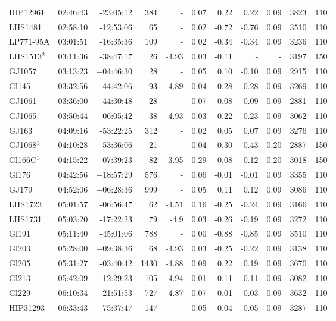 \documentclass[referee]{aa}
\begin{document}
{\begin{longtable}{l r r r r r r r r r r}
HIP12961 & 02:46:43 & -23:05:12 & 384 &    - & 0.07 & 0.22 & 0.22 & 0.09 & 3823 &  110 \\
LHS1481 & 02:58:10 & -12:53:06 & 65 &    - & 0.02 & -0.72 & -0.76 & 0.09 & 3510 &  110 \\
LP771-95A & 03:01:51 & -16:35:36 & 109 &    - & 0.02 & -0.34 & -0.34 & 0.09 & 3236 &  110 \\
LHS1513$^2$ & 03:11:36 & -38:47:17 & 26 & -4.93 & 0.03 & -0.11 & - & - &  3197 &  150 \\
GJ1057 & 03:13:23 & +04:46:30 & 28 &    - & 0.05 & 0.10 & -0.10 & 0.09 & 2915 &  110 \\
Gl145 & 03:32:56 & -44:42:06 & 93 & -4.89 & 0.04 & -0.28 & -0.28 & 0.09 & 3269 &  110 \\
GJ1061 & 03:36:00 & -44:30:48 & 28 &    - & 0.07 & -0.08 & -0.09 & 0.09 & 2881 &  110 \\
GJ1065 & 03:50:44 & -06:05:42 & 38 & -4.93 & 0.03 & -0.22 & -0.23 & 0.09 & 3062 &  110 \\
GJ163 & 04:09:16 & -53:22:25 & 312 &    - & 0.02 & 0.05 & 0.07 & 0.09 & 3276 &  110 \\
GJ1068$^1$ & 04:10:28 & -53:36:06 & 21 &    - & 0.04 & -0.30 & -0.43 & 0.20 & 2887 &  150 \\
Gl166C$^1$ & 04:15:22 & -07:39:23 & 82 & -3.95 & 0.29 & 0.08 & -0.12 & 0.20 & 3018 &  150 \\
Gl176 & 04:42:56 & +18:57:29 & 576 &    - & 0.06 & -0.01 & -0.01 & 0.09 & 3355 &  110 \\
GJ179 & 04:52:06 & +06:28:36 & 999 &    - & 0.05 & 0.11 & 0.12 & 0.09 & 3086 &  110 \\
LHS1723 & 05:01:57 & -06:56:47 & 62 & -4.51 & 0.16 & -0.25 & -0.24 & 0.09 & 3166 &  110 \\
LHS1731 & 05:03:20 & -17:22:23 & 79 & -4.9 & 0.03 & -0.26 & -0.19 & 0.09 & 3272 &  110 \\
Gl191 & 05:11:40 & -45:01:06 & 788 &    - & 0.00 & -0.88 & -0.85 & 0.09 & 3510 &  110 \\
Gl203 & 05:28:00 & +09:38:36 & 68 & -4.93 & 0.03 & -0.25 & -0.22 & 0.09 & 3138 &  110 \\
Gl205 & 05:31:27 & -03:40:42 & 1430 & -4.88 & 0.09 & 0.22 & 0.19 & 0.09 & 3670 &  110 \\
Gl213 & 05:42:09 & +12:29:23 & 105 & -4.94 & 0.01 & -0.11 & -0.11 & 0.09 & 3082 &  110 \\
Gl229 & 06:10:34 & -21:51:53 & 727 & -4.87 & 0.07 & -0.01 & -0.03 & 0.09 & 3632 &  110 \\
HIP31293 & 06:33:43 & -75:37:47 & 147 &    - & 0.05 & -0.04 & -0.05 & 0.09 & 3287 &  110 \\

\end{longtable}}
\end{document}
